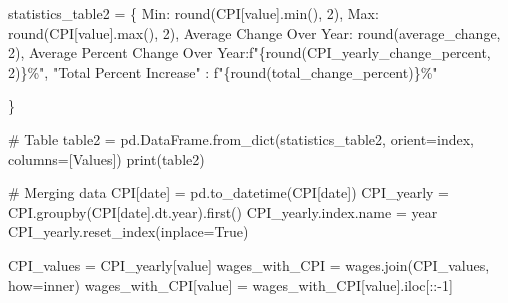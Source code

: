 \documentclass[
  letterpaper,
  DIV=11,
  numbers=noendperiod]{scrartcl}
\newenvironment{Shaded}{\begin{snugshade}}{\end{snugshade}}
\newcommand{\BuiltInTok}[1]{\textcolor[rgb]{0.00,0.23,0.31}{#1}}
\newcommand{\CommentTok}[1]{\textcolor[rgb]{0.37,0.37,0.37}{#1}}
\newcommand{\DecValTok}[1]{\textcolor[rgb]{0.68,0.00,0.00}{#1}}
\newcommand{\NormalTok}[1]{\textcolor[rgb]{0.00,0.23,0.31}{#1}}
\newcommand{\OperatorTok}[1]{\textcolor[rgb]{0.37,0.37,0.37}{#1}}
\newcommand{\SpecialCharTok}[1]{\textcolor[rgb]{0.37,0.37,0.37}{#1}}
\newcommand{\SpecialStringTok}[1]{\textcolor[rgb]{0.13,0.47,0.30}{#1}}
\newcommand{\StringTok}[1]{\textcolor[rgb]{0.13,0.47,0.30}{#1}}
\newcommand{\VariableTok}[1]{\textcolor[rgb]{0.07,0.07,0.07}{#1}}
\begin{document}
\begin{Shaded}
\begin{Highlighting}[]
\NormalTok{statistics\_table2 }\OperatorTok{=}\NormalTok{ \{}
    \StringTok{\textquotesingle{}Min\textquotesingle{}}\NormalTok{: }\BuiltInTok{round}\NormalTok{(CPI[}\StringTok{\textquotesingle{}value\textquotesingle{}}\NormalTok{].}\BuiltInTok{min}\NormalTok{(), }\DecValTok{2}\NormalTok{),}
    \StringTok{\textquotesingle{}Max\textquotesingle{}}\NormalTok{: }\BuiltInTok{round}\NormalTok{(CPI[}\StringTok{\textquotesingle{}value\textquotesingle{}}\NormalTok{].}\BuiltInTok{max}\NormalTok{(), }\DecValTok{2}\NormalTok{),}
    \StringTok{\textquotesingle{}Average Change Over Year\textquotesingle{}}\NormalTok{: }\BuiltInTok{round}\NormalTok{(average\_change, }\DecValTok{2}\NormalTok{),}
    \StringTok{\textquotesingle{}Average Percent Change Over Year\textquotesingle{}}\NormalTok{:}\SpecialStringTok{f"}\SpecialCharTok{\{}\BuiltInTok{round}\NormalTok{(CPI\_yearly\_change\_percent, }\DecValTok{2}\NormalTok{)}\SpecialCharTok{\}}\SpecialStringTok{\%"}\NormalTok{,}
    \StringTok{"Total Percent Increase"}\NormalTok{ : }\SpecialStringTok{f"}\SpecialCharTok{\{}\BuiltInTok{round}\NormalTok{(total\_change\_percent)}\SpecialCharTok{\}}\SpecialStringTok{\%"}

\NormalTok{\}}

\CommentTok{\# Table}
\NormalTok{table2 }\OperatorTok{=}\NormalTok{ pd.DataFrame.from\_dict(statistics\_table2, orient}\OperatorTok{=}\StringTok{\textquotesingle{}index\textquotesingle{}}\NormalTok{, columns}\OperatorTok{=}\NormalTok{[}\StringTok{\textquotesingle{}Values\textquotesingle{}}\NormalTok{])}
\BuiltInTok{print}\NormalTok{(table2)}


\CommentTok{\# Merging data}
\NormalTok{CPI[}\StringTok{\textquotesingle{}date\textquotesingle{}}\NormalTok{] }\OperatorTok{=}\NormalTok{ pd.to\_datetime(CPI[}\StringTok{\textquotesingle{}date\textquotesingle{}}\NormalTok{])}
\NormalTok{CPI\_yearly }\OperatorTok{=}\NormalTok{ CPI.groupby(CPI[}\StringTok{\textquotesingle{}date\textquotesingle{}}\NormalTok{].dt.year).first()}
\NormalTok{CPI\_yearly.index.name }\OperatorTok{=} \StringTok{\textquotesingle{}year\textquotesingle{}}
\NormalTok{CPI\_yearly.reset\_index(inplace}\OperatorTok{=}\VariableTok{True}\NormalTok{)}

\NormalTok{CPI\_values }\OperatorTok{=}\NormalTok{ CPI\_yearly[}\StringTok{\textquotesingle{}value\textquotesingle{}}\NormalTok{]}
\NormalTok{wages\_with\_CPI }\OperatorTok{=}\NormalTok{ wages.join(CPI\_values, how}\OperatorTok{=}\StringTok{\textquotesingle{}inner\textquotesingle{}}\NormalTok{)}
\NormalTok{wages\_with\_CPI[}\StringTok{\textquotesingle{}value\textquotesingle{}}\NormalTok{] }\OperatorTok{=}\NormalTok{ wages\_with\_CPI[}\StringTok{\textquotesingle{}value\textquotesingle{}}\NormalTok{].iloc[::}\OperatorTok{{-}}\DecValTok{1}\NormalTok{]}


\end{Highlighting}
\end{Shaded}
\end{document}
